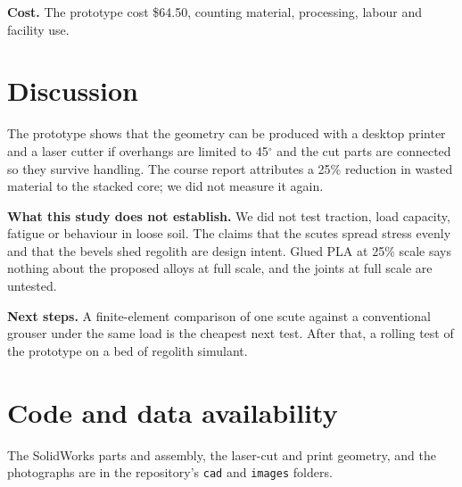 \documentclass[11pt,letterpaper]{article}
\begin{document}
\textbf{Cost.} The prototype cost \$64.50, counting material, processing, labour and facility use.

\section{Discussion}\label{sec:discussion}
The prototype shows that the geometry can be produced with a desktop printer and a laser cutter if overhangs are limited to 45$^\circ$ and the cut parts are connected so they survive handling. The course report attributes a 25\% reduction in wasted material to the stacked core; we did not measure it again.

\textbf{What this study does not establish.} We did not test traction, load capacity, fatigue or behaviour in loose soil. The claims that the scutes spread stress evenly and that the bevels shed regolith are design intent. Glued PLA at 25\% scale says nothing about the proposed alloys at full scale, and the joints at full scale are untested.

\textbf{Next steps.} A finite-element comparison of one scute against a conventional grouser under the same load is the cheapest next test. After that, a rolling test of the prototype on a bed of regolith simulant.

\section*{Code and data availability}\label{sec:avail}
The SolidWorks parts and assembly, the laser-cut and print geometry, and the photographs are in the repository's \texttt{cad} and \texttt{images} folders.



\end{document}
